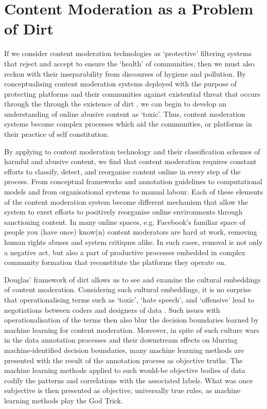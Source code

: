 \section{Content Moderation as a Problem of Dirt}
If we consider content moderation technologies as `protective' filtering systems that reject and accept to ensure the `health' of communities, then we must also reckon with their inseparability from discourses of hygiene and pollution. By conceptualising content moderation systems deployed with the purpose of protecting platforms and their communities against existential threat that occurs through the through the existence of dirt \cite{Lepawsky:2019}, we can begin to develop an understanding of online abusive content as `toxic'. Thus, content moderation systems become complex processes which aid the communities, or platforms in their practice of self constitution.

By applying \citet{Douglas:1966} to content moderation technology and their classification schemes of harmful and abusive content, we find that content moderation requires constant efforts to classify, detect, and reorganise content online in every step of the process. From conceptual frameworks and annotation guidelines to computational models and from organisational systems to manual labour. Each of these elements of the content moderation system become different mechanism that allow the system to exert efforts to positively reorganise online environments through sanctioning content. In many online spaces, e.g. Facebook's familiar space of people you (have once) know(n) content moderators are hard at work, removing human rights abuses and system critiques alike. In such cases, removal is not only a negative act, but also a part of productive processes embedded in complex community formation that reconstitute the platforms they operate on.

Douglas' framework of dirt allows us to see and examine the cultural embeddings of content moderation. Considering such cultural embeddings, it is no surprise that operationalising terms such as `toxic', `hate speech', and `offensive' lead to negotiations between coders and designers of data \cite{Waseem:2016}. Such issues with operationalisation of the terms then also blur the decision boundaries learned by machine learning for content moderation. Moreover, in spite of such culture wars in the data annotation processes and their downstream effects on blurring machine-identified decision boundaries, many machine learning methods are presented with the result of the annotation process as objective truths. The machine learning methods applied to such would-be objective bodies of data codify the patterns and correlations with the associated labels. What was once subjective is then presented as objective, universally true rules, as machine learning methods play the God Trick.\vspace{5mm}

